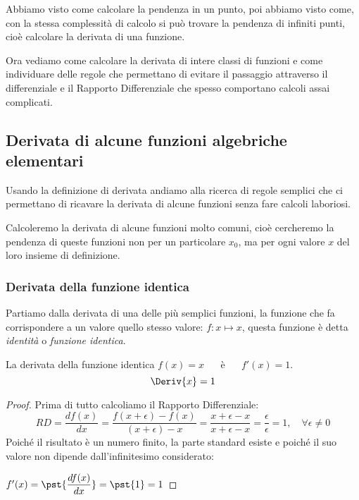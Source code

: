 Abbiamo visto come calcolare la pendenza in un punto, 
poi abbiamo visto come, con la stessa complessità di calcolo si può 
trovare la pendenza di infiniti punti, cioè calcolare la derivata 
di una funzione.

Ora vediamo come calcolare la derivata di intere classi di funzioni e 
come individuare delle regole che permettano di evitare il passaggio 
attraverso il differenziale e il Rapporto Differenziale che spesso 
comportano calcoli assai complicati.

\subsection{Derivata di alcune funzioni algebriche elementari}
\label{subsec:differenziazione_derivatafsemplici}

Usando la definizione di derivata andiamo alla ricerca di regole semplici che 
ci permettano di ricavare la derivata di alcune funzioni senza fare calcoli 
laboriosi.

Calcoleremo la derivata di alcune funzioni molto comuni, cioè cercheremo 
la pendenza di queste funzioni non per un particolare \(x_0\), ma per ogni 
valore \(x\) del loro insieme di definizione.

\subsubsection{Derivata della funzione identica}
\label{subsec:differenziazione_derivatafidentica}

Partiamo dalla derivata di una delle più semplici funzioni, la funzione 
che fa corrispondere a un valore quello stesso valore: 
\(f: x \mapsto x\), questa funzione è detta \emph{identità} o 
\emph{funzione identica}.
\begin{teorema}
La derivata della funzione identica \(f(x) = x\) ~~ è ~~  \(f'(x) = 1\).
\[\Deriv{x} = 1\]
\end{teorema}
\begin{proof}
Prima di tutto calcoliamo il Rapporto Differenziale:
\[RD = \dfrac{df(x)}{dx}=
\dfrac{f(x+\epsilon)-f(x)}{(x +\epsilon) -x}=
\dfrac{x+\epsilon-x}{x +\epsilon -x}=
\dfrac{\epsilon}{\epsilon}=1, \quad 
\forall \epsilon \ne 0\]
Poiché il risultato è un numero finito, la parte standard esiste e 
poiché il suo valore non dipende dall'infinitesimo considerato:

\hspace{40mm} \(f'(x)=\pst{\dfrac{df(x)}{dx}}=\pst{1}=1\)
\end{proof}

